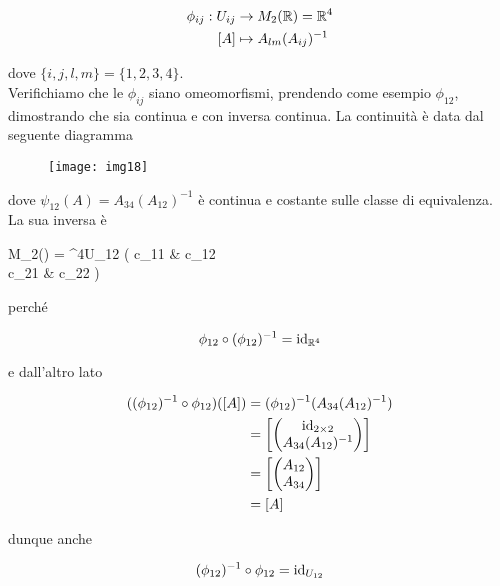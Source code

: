 \begin{align}
	\begin{split}
		\phi_{ij} : U_{ij} &\to M_{2}(\mathbb{R}) = \mathbb{R}^{4}\\
		[A] &\mapsto A_{lm} (A_{ij})^{-1}
	\end{split}
\end{align}

dove $ \{i,j,l,m\}=\{1,2,3,4\} $.\\
Verifichiamo che le $ \phi_{ij} $ siano omeomorfismi, prendendo come esempio $ \phi_{12} $, dimostrando che sia continua e con inversa continua. La continuità è data dal seguente diagramma

\begin{figure}[H]
	\centering
	\texttt{[image: img18]}
\end{figure}

dove $ \psi_{12}(A) = A_{34} (A_{12})^{-1} $ è continua e costante sulle classe di equivalenza.\\
La sua inversa è

%
	{M_{2}(\R) = \R^{4}}{U_{12}}%
	{\mqty( c_{11} & c_{12} \\ c_{21} & c_{22} )}{}

perché

\begin{equation}
	\phi_{12} \circ (\phi_{12})^{-1} = \operatorname{id}_{\mathbb{R}^{4}}
\end{equation}

e dall'altro lato

\begin{align}
	\begin{split}
		((\phi_{12})^{-1} \circ \phi_{12})([A]) &= (\phi_{12})^{-1}(A_{34} (A_{12})^{-1})\\
		&= \left[ \mqty( \id_{2 \times 2} \\ A_{34} (A_{12})^{-1} ) \right]\\
		&= \left[ \mqty( A_{12} \\ A_{34} ) \right]\\
		&= [A]
	\end{split}
\end{align}

dunque anche

\begin{equation}
	(\phi_{12})^{-1} \circ \phi_{12} = \operatorname{id}_{U_{12}}
\end{equation}

